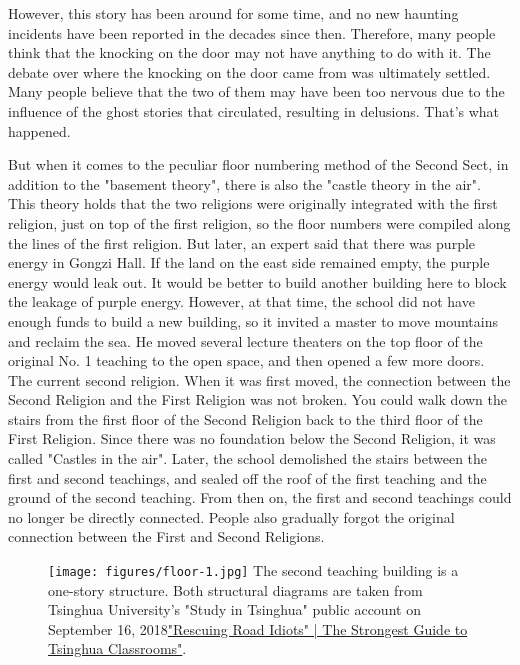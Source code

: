 However, this story has been around for some time, and no new haunting
incidents have been reported in the decades since then. Therefore, many people
think that the knocking on the door may not have anything to do with it.  The
debate over where the knocking on the door came from was ultimately settled.
Many people believe that the two of them may have been too nervous due to the
influence of the ghost stories that circulated, resulting in delusions.  That's
what happened.

But when it comes to the peculiar floor numbering method of the Second Sect, in
addition to the "basement theory", there is also the "castle theory in the
air".  This theory holds that the two religions were originally integrated with
the first religion, just on top of the first religion, so the floor numbers
were compiled along the lines of the first religion.  But later, an expert said
that there was purple energy in Gongzi Hall. If the land on the east side
remained empty, the purple energy would leak out. It would be better to build
another building here to block the leakage of purple energy.  However, at that
time, the school did not have enough funds to build a new building, so it
invited a master to move mountains and reclaim the sea. He moved several
lecture theaters on the top floor of the original No. 1 teaching to the open
space, and then opened a few more doors. The current second religion.  When it
was first moved, the connection between the Second Religion and the First
Religion was not broken. You could walk down the stairs from the first floor of
the Second Religion back to the third floor of the First Religion. Since there
was no foundation below the Second Religion, it was called "Castles in the
air".  Later, the school demolished the stairs between the first and second
teachings, and sealed off the roof of the first teaching and the ground of the
second teaching. From then on, the first and second teachings could no longer
be directly connected. People also gradually forgot the original connection
between the First and Second Religions.

\begin{figure}[!t]
	\centering
	\texttt{[image: figures/floor-1.jpg]}
	The second teaching building is a one-story structure. Both structural
	diagrams are taken from Tsinghua University's "Study in Tsinghua" public
	account on September 16,
	2018\href{https://mp.weixin.qq.com/s/SHW-wviq3NYemcHZBRgi5w}{"Rescuing Road
	Idiots" | The Strongest Guide to Tsinghua Classrooms"}.
\end{figure}

